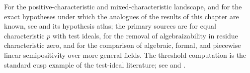 For the positive-characteristic and mixed-characteristic landscape, and for
the exact hypotheses under which the analogues of the results of this
chapter are known, see  and its hypothesis atlas;
the primary sources are \cite{GJKM19} for equal characteristic \(p\) with
test ideals, \cite{BGGJKM20} for the removal of algebraizability in residue
characteristic zero, and \cite{GM19} for the comparison of algebraic,
formal, and piecewise linear semipositivity over more general fields.  The
threshold computation  is the standard cusp example
of the test-ideal literature; see \cite{HY03} and \cite{ST12}.
